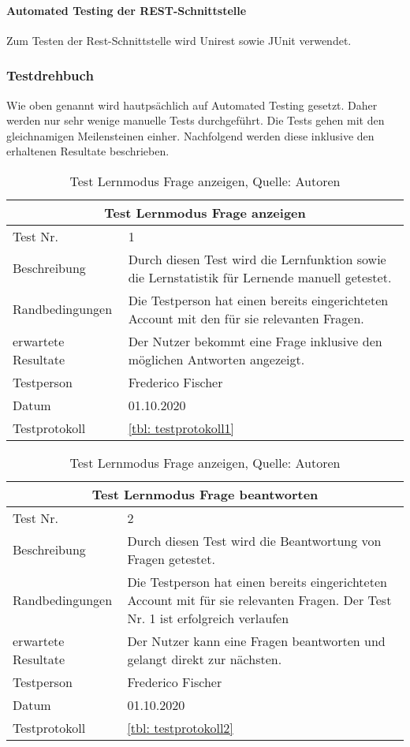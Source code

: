 \paragraph{Automated Testing der REST-Schnittstelle}
Zum Testen der Rest-Schnittstelle wird Unirest sowie JUnit verwendet.  


\subsubsection{Testdrehbuch}\label{testsvonmeilensteine}
Wie oben genannt wird hautpsächlich auf Automated Testing gesetzt.
Daher werden nur sehr wenige manuelle Tests durchgeführt.
Die Tests gehen mit den gleichnamigen Meilensteinen einher.
Nachfolgend werden diese inklusive den erhaltenen Resultate beschrieben.

\begin{table}[H]
\begin{tabularx}{\textwidth}{lX}
  \hline
  \multicolumn{2}{|c|}{Test Lernmodus Frage anzeigen} \\
  \hline
  Test Nr. & 1\\
  Beschreibung & Durch diesen Test wird die Lernfunktion sowie die Lernstatistik für Lernende manuell getestet.\\
  Randbedingungen & Die Testperson hat einen bereits eingerichteten Account mit den für sie relevanten Fragen.\\
  erwartete Resultate & Der Nutzer bekommt eine Frage inklusive den möglichen Antworten angezeigt.  \\
  Testperson & Frederico Fischer \\
  Datum & 01.10.2020 \\
  Testprotokoll & \ref{tbl: testprotokoll1}\\
   \hline
\end{tabularx}
\caption{ \label{tbl: Test Lernmodus Frage anzeigen}Test Lernmodus Frage anzeigen, Quelle: Autoren}
\end{table}


\begin{table}[H]
\begin{tabularx}{\textwidth}{lX}
  \hline
  \multicolumn{2}{|c|}{Test Lernmodus Frage beantworten} \\
  \hline
  Test Nr. & 2\\
  Beschreibung & Durch diesen Test wird die Beantwortung von Fragen getestet.\\
  Randbedingungen & Die Testperson hat einen bereits eingerichteten Account mit für sie relevanten Fragen. Der Test Nr. 1 ist erfolgreich verlaufen\\
  erwartete Resultate & Der Nutzer kann eine Fragen beantworten und gelangt direkt zur nächsten.  \\
  Testperson & Frederico Fischer \\
  Datum & 01.10.2020 \\
  Testprotokoll & \ref{tbl: testprotokoll2}\\
   \hline
\end{tabularx}
\caption{ \label{tbl: Test Lernmodus Frage beantworten}Test Lernmodus Frage anzeigen, Quelle: Autoren}
\end{table}

